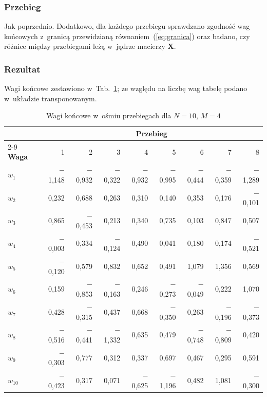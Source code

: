 \documentclass[12pt]{article}
\begin{document}
\subsubsection{Przebieg}
Jak poprzednio. Dodatkowo, dla każdego przebiegu sprawdzano zgodność wag końcowych
z~granicą przewidzianą równaniem~(\ref{eq:granica}) oraz badano, czy różnice między
przebiegami leżą w~jądrze macierzy $\mathbf{X}$.

\subsubsection{Rezultat}
Wagi końcowe zestawiono w~Tab.~\ref{tab:nm3}; ze względu na liczbę wag tabelę podano
w~układzie transponowanym.

\begin{table}[h]
\centering
\caption{Wagi końcowe w~ośmiu przebiegach dla $N=10$, $M=4$}
\label{tab:nm3}
\footnotesize
\begin{tabular}{lrrrrrrrr}
\toprule
 & \multicolumn{8}{c}{\textbf{Przebieg}} \\
\cmidrule(l){2-9}
\textbf{Waga} & 1 & 2 & 3 & 4 & 5 & 6 & 7 & 8 \\
\midrule
$w_1$    & $-$1,148 & $-$0,932 & $-$0,322 & $-$0,932 & $-$0,995 & $-$0,444 & $-$0,359 & $-$1,289 \\
$w_2$    &    0,232 &    0,688 &    0,263 &    0,310 &    0,140 &    0,353 &    0,176 & $-$0,101 \\
$w_3$    &    0,865 & $-$0,453 &    0,213 &    0,340 &    0,735 &    0,103 &    0,847 &    0,507 \\
$w_4$    & $-$0,003 &    0,334 & $-$0,124 &    0,490 &    0,041 &    0,180 &    0,174 & $-$0,521 \\
$w_5$    & $-$0,120 &    0,579 &    0,832 &    0,652 &    0,491 &    1,079 &    1,356 &    0,569 \\
$w_6$    &    0,159 & $-$0,853 & $-$0,163 &    0,246 & $-$0,273 & $-$0,049 &    0,222 &    1,070 \\
$w_7$    &    0,428 & $-$0,315 &    0,437 &    0,668 & $-$0,350 &    0,263 & $-$0,196 & $-$0,373 \\
$w_8$    & $-$0,516 & $-$0,441 & $-$1,332 &    0,635 &    0,479 & $-$0,748 & $-$0,809 &    0,420 \\
$w_9$    & $-$0,303 &    0,777 &    0,312 &    0,337 &    0,697 &    0,467 &    0,295 &    0,591 \\
$w_{10}$ & $-$0,423 &    0,317 &    0,071 & $-$0,625 & $-$1,196 &    0,482 &    1,081 & $-$0,300 \\
\bottomrule
\end{tabular}
\end{table}
\end{document}
